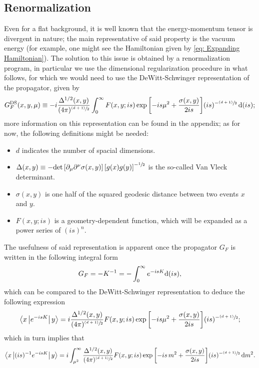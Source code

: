 \subsection{Renormalization}
Even for a flat background, it is well known that the energy-momentum tensor is divergent in nature; the main representative of said property is the vacuum energy (for example, one might see the Hamiltonian given by \ref{eq: Expanding Hamiltonian}). The solution to this issue is obtained by a renormalization program, in particular we use the dimensional regularization procedure in what follows, for which we would need to use the DeWitt-Schwinger representation of the propagator, given by
\begin{equation}
	G_F^{\text{DS}}(x,y,\mu)\equiv -i\frac{\Delta^{1/2}(x,y)}{(4\pi)^{\sfrac{(d+1)}{2}}}\int^\infty_0F(x,y;is)\exp{\left[-is\mu^2+\frac{\sigma(x,y)}{2is}\right]}(is)^{-\sfrac{(d+1)}{2}}\,\text{d} (is);
\end{equation}
more information on this representation can be found in the appendix; as for now, the following definitions might be needed:
\begin{itemize}
	\item $d$ indicates the number of spacial dimensions.
	\item $\Delta(x,y)\equiv -\text{det}\left[\partial_\mu\partial^\nu\sigma(x,y)\right]\left[g(x)g(y)\right]^{-\sfrac{1}{2}}$ is the so-called Van Vleck determinant.
	\item $\sigma(x,y)$ is one half of the squared geodesic distance between two events $x$ and $y$.
	\item $F(x,y;is)$ is a geometry-dependent function, which will be expanded as a power series of $(is)^n$.
\end{itemize}


The usefulness of said representation is apparent once the propagator $G_F$ is written in the following integral form
\begin{equation}
	G_F=-K^{-1}=-\int_0^\infty e^{-is K}\text{d} (is),
\end{equation}
which can be compared to the DeWitt-Schwinger representation to deduce the following expression
\begin{equation}
\left\langle x\left|e^{-isK}\right|y\right\rangle=i\frac{\Delta^{1/2}(x,y)}{(4\pi)^{\sfrac{(d+1)}{2}}}F(x,y;is)\exp{\left[-is\mu^2+\frac{\sigma(x,y)}{2is}\right]}(is)^{-\sfrac{(d+1)}{2}};
\end{equation}
which in turn implies that
\begin{equation}
	\left\langle x\left|(is)^{-1}e^{-isK}\right|y\right\rangle=i\int_{\mu^2}^\infty\frac{\Delta^{1/2}(x,y)}{(4\pi)^{\sfrac{(d+1)}{2}}}F(x,y;is)\exp{\left[-is\,m^2+\frac{\sigma(x,y)}{2is}\right]}(is)^{-\sfrac{(d+1)}{2}}\,\text{d} m^2.
\end{equation}

